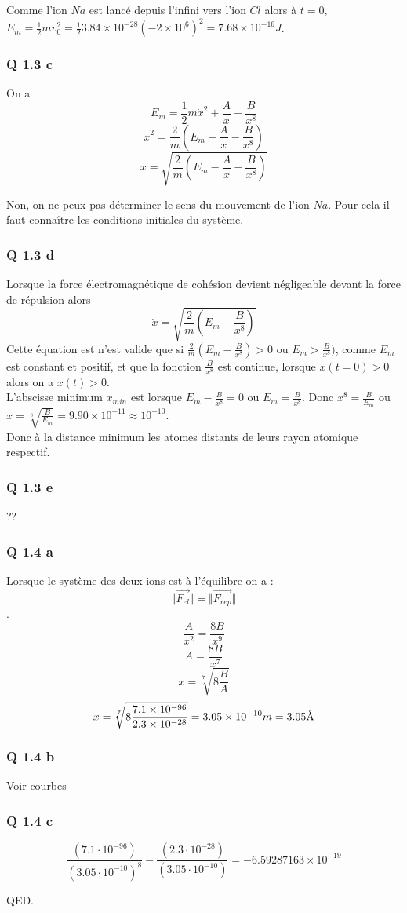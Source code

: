 \documentclass[]{book}
\theoremstyle{definition}
\begin{document}
Comme l'ion $Na$ est lanc\'e depuis l'infini vers l'ion $Cl$ alors \`a $t=0$, $E_m = \frac{1}{2}mv_0^2 = \frac{1}{2}3.84\times10^{-28}(-2\times10^6)^2 = 7.68\times10^{-16}J$.


\subsubsection*{Q 1.3 c}
On a 
$$E_m = \frac{1}{2}m\dot{x}^2 + \frac{A}{x} + \frac{B}{x^8}$$
$$\dot{x}^2 = \frac{2}{m}(E_m -\frac{A}{x} - \frac{B}{x^8})$$
$$\dot{x} = \sqrt{\frac{2}{m}(E_m -\frac{A}{x} - \frac{B}{x^8})}$$

Non, on ne peux pas d\'eterminer le sens du mouvement de l'ion $Na$. Pour cela il faut conna\^itre les conditions initiales du syst\`eme.\\

\subsubsection*{Q 1.3 d}
Lorsque la force \'electromagn\'etique de coh\'esion devient n\'egligeable devant la force de r\'epulsion alors 
$$\dot{x} = \sqrt{\frac{2}{m}(E_m - \frac{B}{x^8})}$$
Cette \'equation est n'est valide que si $\frac{2}{m}(E_m - \frac{B}{x^8}) > 0$ ou $E_m > \frac{B}{x^8})$, comme $E_m$ est constant et positif, et que la fonction $\frac{B}{x^8}$ est continue, lorsque $x(t=0) > 0$ alors on a $x(t) > 0$.\\

L'abscisse minimum $x_{min}$ est lorsque $E_m - \frac{B}{x^8} = 0$ ou $E_m = \frac{B}{x^8}$. Donc $x^8=\frac{B}{E_m}$ ou $x=\sqrt[8]{\frac{B}{E_m}} = 9.90\times10^{-11} \approx 10^{-10}$.\\

Donc \`a la distance minimum les atomes distants de leurs rayon atomique respectif. 

\subsubsection*{Q 1.3 e}
??

\subsubsection*{Q 1.4 a}
Lorsque le syst\`eme des deux ions est \`a l'\'equilibre on a :
$$\Vert \overrightarrow{F_{el}}\Vert = \Vert \overrightarrow{F_{rep}}\Vert$$.
$$\frac{A}{x^2} = \frac{8B}{x^9}$$
$$A = \frac{8B}{x^7}$$
$$x = \sqrt[7]{8\frac{B}{A}}$$
$$x = \sqrt[7]{8\frac{7.1\times10^{-96}}{2.3\times10^{-28}}} = 3.05\times10^{-10}m = 3.05 \textup{\AA}$$

\subsubsection*{Q 1.4 b}
Voir courbes


\subsubsection*{Q 1.4 c}
$$\frac{\left(7.1\cdot10^{-96}\right)}{\left(3.05\cdot10^{-10}\right)^{8}} - \frac{\left(2.3\cdot10^{-28}\right)}{\left(3.05\cdot10^{-10}\right)} = −6.59287163×10^{−19}$$

QED.
\end{document}
